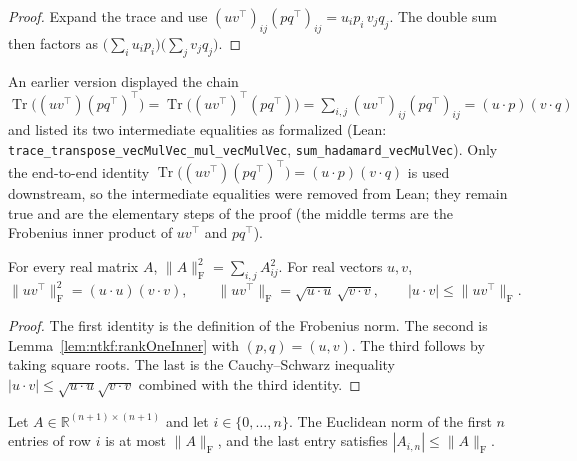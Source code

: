 \begin{proof}
  \leanok
Expand the trace and use $(uv^\top)_{ij}(pq^\top)_{ij}=u_ip_i\,v_jq_j$. The double sum then
factors as $\bigl(\sum_iu_ip_i\bigr)\bigl(\sum_jv_jq_j\bigr)$.
\end{proof}

\begin{remark}\label{rmk:ntkf:rankOneChange}
An earlier version displayed the chain $\operatorname{Tr}\bigl((uv^\top)(pq^\top)^\top\bigr)=\operatorname{Tr}\bigl((uv^\top)^\top(pq^\top)\bigr)=\sum_{i,j}(uv^\top)_{ij}(pq^\top)_{ij}=(u\cdot p)(v\cdot q)$ and listed its two intermediate equalities as formalized (Lean: \texttt{trace\_transpose\_vecMulVec\_mul\_vecMulVec}, \texttt{sum\_hadamard\_vecMulVec}). Only the end-to-end identity $\operatorname{Tr}\bigl((uv^\top)(pq^\top)^\top\bigr)=(u\cdot p)(v\cdot q)$ is used downstream, so the intermediate equalities were removed from Lean; they remain true and are the elementary steps of the proof (the middle terms are the Frobenius inner product of $uv^\top$ and $pq^\top$).
\end{remark}


\begin{lemma}\label{lem:ntkf:rankOneNorm}
  \leanok
For every real matrix $A$, $\|A\|_{\mathrm F}^2=\sum_{i,j}A_{ij}^2$. For real vectors $u,v$,
\[
  \|uv^\top\|_{\mathrm F}^2=(u\cdot u)(v\cdot v),\qquad
  \|uv^\top\|_{\mathrm F}=\sqrt{u\cdot u}\,\sqrt{v\cdot v},\qquad
  |u\cdot v|\le\|uv^\top\|_{\mathrm F}.
\]
\end{lemma}

\begin{proof}
  \leanok
The first identity is the definition of the Frobenius norm. The second is
Lemma~\ref{lem:ntkf:rankOneInner} with $(p,q)=(u,v)$. The third follows by taking square roots.
The last is the Cauchy--Schwarz inequality $|u\cdot v|\le\sqrt{u\cdot u}\sqrt{v\cdot v}$
combined with the third identity.
\end{proof}

\begin{lemma}\label{lem:ntkf:rowBound}
  \leanok
Let $A\in\mathbb R^{(n+1)\times(n+1)}$ and let $i\in\{0,\dots,n\}$. The Euclidean norm of the
first $n$ entries of row $i$ is at most $\|A\|_{\mathrm F}$, and the last entry satisfies
$|A_{i,n}|\le\|A\|_{\mathrm F}$.
\end{lemma}

